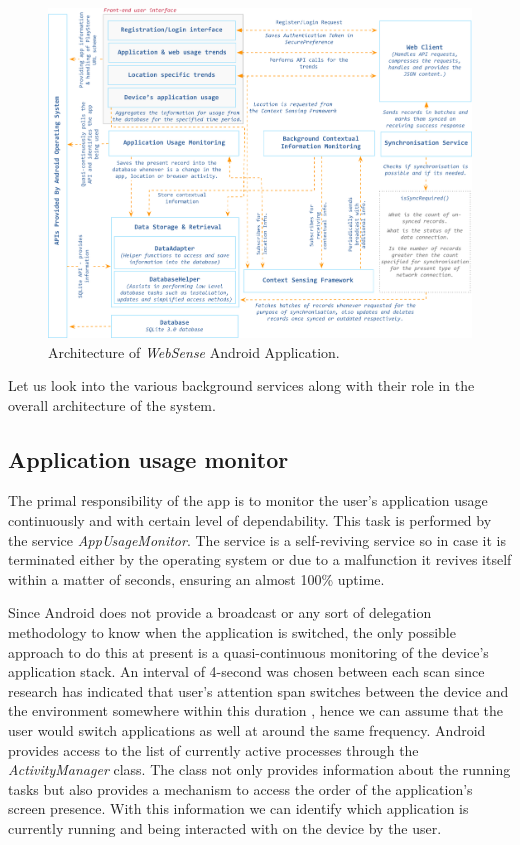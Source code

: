 \documentclass[12pt]{report}
\begin{document}
\begin{figure}[hbtp]
 \centering
 \includegraphics[width=160mm]{WebsenseArch.png}
  \caption[Architecture of \textit{WebSense} Android Application.]{Architecture of \textit{WebSense} Android Application.}
 \label{figure:WebSenseArch}
\end{figure}

Let us look into the various background services along with their role in the overall architecture of the system.
 
\subsection{Application usage monitor}

The primal responsibility of the app is to monitor the user's application usage continuously and with certain level of dependability. This task is performed by the service \textit{AppUsageMonitor}. The service is a self-reviving service so in case it is terminated either by the operating system or due to a malfunction it revives itself within a matter of seconds, ensuring an almost 100\% uptime.

Since Android does not provide a broadcast or any sort of delegation methodology to know when the application is switched, the only possible approach to do this at present is a quasi-continuous monitoring of the device's application stack. An interval of 4-second was chosen between each scan since research has indicated that user's attention span switches between the device and the environment somewhere within this duration \cite{oulasvirta2005interaction}, hence we can assume that the user would switch applications as well at around the same frequency. Android provides access to the list of currently active processes through the \textit{ActivityManager} class. The class not only provides information about the running tasks but also provides a mechanism to access the order of the application's screen presence. With this information we can identify which application is currently running and being interacted with on the device by the user.
\end{document}
